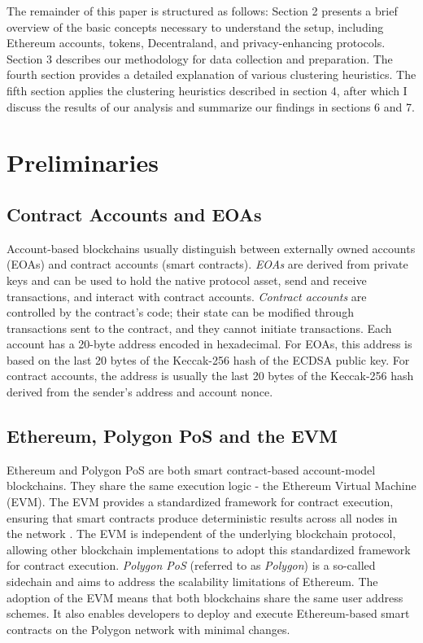 \documentclass[12pt,a4paper,titlepage,oneside,english]{article}
\begin{document}
The remainder of this paper is structured as follows: Section 2 presents a brief overview of the basic concepts necessary to understand the setup, including Ethereum accounts, tokens, Decentraland, and privacy-enhancing protocols. Section 3 describes our methodology for data collection and preparation. The fourth section provides a detailed explanation of various clustering heuristics. The fifth section applies the clustering heuristics described in section 4, after which I discuss the results of our analysis and summarize our findings in sections 6 and 7.



\section{Preliminaries}

\subsection{Contract Accounts and EOAs}
Account-based blockchains usually distinguish between externally owned accounts (EOAs) and contract accounts (smart contracts). \textit{EOAs} are derived from private keys and can be used to hold the native protocol asset, send and receive transactions, and interact with contract accounts. \textit{Contract accounts} are controlled by the contract's code; their state can be modified through transactions sent to the contract, and they cannot initiate transactions. \citep{buterin2014ethereum} \newline Each account has a 20-byte address encoded in hexadecimal. For EOAs, this address is based on the last 20 bytes of the Keccak-256 hash of the ECDSA public key. For contract accounts, the address is usually the last 20 bytes of the Keccak-256 hash derived from the sender's address and account nonce. \citep{GW:14}

\subsection{Ethereum, Polygon PoS and the EVM}
Ethereum and Polygon PoS are both smart contract-based account-model blockchains. They share the same execution logic - the Ethereum Virtual Machine (EVM).
The EVM provides a standardized framework for contract execution, ensuring that smart contracts produce deterministic results across all nodes in the network \citep{GW:14}. The EVM is independent of the underlying blockchain protocol, allowing other blockchain implementations to adopt this standardized framework for contract execution.\newline
\textit{Polygon PoS} (referred to as \textit{Polygon}) is a so-called sidechain and aims to address the scalability limitations of Ethereum. The adoption of the EVM means that both blockchains share the same user address schemes. It also enables developers to deploy and execute Ethereum-based smart contracts on the Polygon network with minimal changes. \citep{matic_whitepaper}
\end{document}
